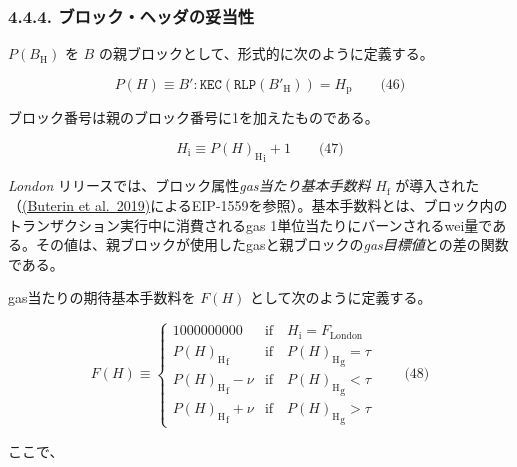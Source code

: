 \documentclass[
]{ltjsarticle}
\begin{document}
\hypertarget{ux30d6ux30edux30c3ux30afux30d8ux30c3ux30c0ux306eux59a5ux5f53ux6027}{%
\subsubsection{4.4.4.
ブロック・ヘッダの妥当性}\label{ux30d6ux30edux30c3ux30afux30d8ux30c3ux30c0ux306eux59a5ux5f53ux6027}}

\(P(B_{\mathrm{H}})\) を \(B\)
の親ブロックとして、形式的に次のように定義する。

\protect\hypertarget{eq-46}{}{}

\[P(H) \equiv B': \mathtt{KEC}(\mathtt{RLP}(B'_{\mathrm{H}})) = H_{\mathrm{p}} \qquad \text{(46)}\]

\hypertarget{block_number_H__i}{}

ブロック番号は親のブロック番号に1を加えたものである。

\protect\hypertarget{eq-47}{}{}

\[H_{\mathrm{i}} \equiv {{P(H)_{\mathrm{H}}}_{\mathrm{i}}} + 1 \qquad \text{(47)}\]

\protect\hypertarget{H__f}{}{}

\emph{London} リリースでは、ブロック属性\emph{gas当たり基本手数料}
\protect\hyperlink{block_baseFeePerGas_H__f}{\(H_{\mathrm{f}}\)}
が導入された（\protect\hyperlink{ref-EIP-1559}{(Buterin et
al.~2019)}によるEIP-1559を参照）。基本手数料とは、ブロック内のトランザクション実行中に消費されるgas
1単位当たりにバーンされるwei量である。その値は、親ブロックが使用したgasと親ブロックの\emph{gas目標値}との差の関数である。

gas当たりの期待基本手数料を \(F(H)\) として次のように定義する。

\protect\hypertarget{eq-48}{}{}

\[F(H) \equiv \begin{cases}
    1000000000  & \text{if} \quad H_{\mathrm{i}} = F_{\mathrm{London}} \\
    {P(H)_{\mathrm{H}}}_{\mathrm{f}}  & \text{if} \quad {P(H)_{\mathrm{H}}}_{\mathrm{g}} = \tau \\
    {P(H)_{\mathrm{H}}}_{\mathrm{f}} - \nu & \text{if} \quad {P(H)_{\mathrm{H}}}_{\mathrm{g}} < \tau \\
    {P(H)_{\mathrm{H}}}_{\mathrm{f}} + \nu & \text{if} \quad {P(H)_{\mathrm{H}}}_{\mathrm{g}} > \tau
  \end{cases} \qquad \text{(48)}\]

ここで、

\protect\hypertarget{eq-49}{}{}\protect\hypertarget{eq-50}{}{}\protect\hypertarget{eq-51}{}{}\protect\hypertarget{eq-52}{}{}\protect\hypertarget{eq-53}{}{}
\end{document}
